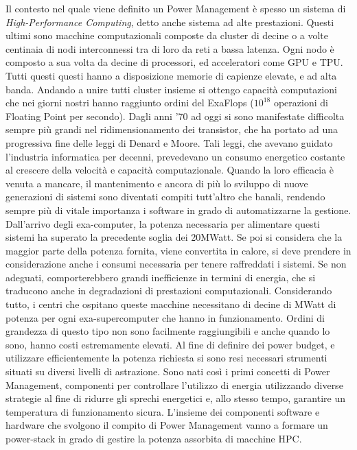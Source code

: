 Il contesto nel quale viene definito un Power Management è spesso un sistema di \emph{High-Performance Computing}, detto anche sistema ad alte prestazioni. Questi ultimi sono macchine computazionali composte da cluster di decine o a volte centinaia di nodi interconnessi tra di loro da reti a bassa latenza. Ogni nodo è composto a sua volta da decine di processori, ed acceleratori come GPU e TPU. Tutti questi questi hanno a disposizione memorie di capienze elevate, e ad alta banda. Andando a unire tutti cluster insieme si ottengo capacità computazioni che nei giorni nostri hanno raggiunto ordini del ExaFlops ($10^{18}$ operazioni di Floating Point per secondo). Dagli anni '70 ad oggi si sono manifestate difficolta sempre più grandi nel ridimensionamento dei transistor, che ha portato ad una progressiva fine delle leggi di Denard e Moore\cite{TODO}. Tali leggi, che avevano guidato l'industria informatica per decenni, prevedevano un consumo energetico costante al crescere della velocità e capacità computazionale. Quando la loro efficacia è venuta a mancare, il mantenimento e ancora di più lo sviluppo di nuove generazioni di sistemi sono diventati compiti tutt'altro che banali, rendendo sempre più di vitale importanza i software in grado di automatizzarne la gestione.
Dall'arrivo degli exa-computer, la potenza necessaria per alimentare questi sistemi ha superato la precedente soglia dei 20MWatt\cite{TODO}. Se poi si considera che la maggior parte della potenza fornita, viene convertita in calore, si deve prendere in considerazione anche i consumi necessaria per tenere raffreddati i sistemi. Se non adeguati, comporterebbero grandi inefficienze in termini di energia, che si traducono anche in degradazioni di prestazioni computazionali. Considerando tutto, i centri che ospitano queste macchine necessitano di decine di MWatt di potenza per ogni exa-supercomputer che hanno in funzionamento. Ordini di grandezza di questo tipo non sono facilmente raggiungibili e anche quando lo sono, hanno costi estremamente elevati. 
Al fine di definire dei power budget, e utilizzare efficientemente la potenza richiesta si sono resi necessari strumenti situati su diversi livelli di astrazione. 
Sono nati così i primi concetti di Power Management, componenti per controllare l'utilizzo di energia utilizzando diverse strategie al fine di ridurre gli sprechi energetici e, allo stesso tempo, garantire un temperatura di funzionamento sicura.%
L'insieme dei componenti software e hardware che svolgono il compito di Power Management vanno a formare un power-stack in grado di gestire la potenza assorbita di macchine HPC.



